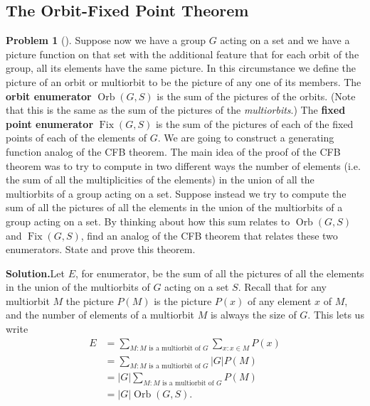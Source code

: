 \documentclass[10pt,]{book}
\newcommand{\terminology}[1]{\textbf{#1}}
\theoremstyle{plain}
\theoremstyle{definition}
\newtheorem{activity}[project]{Problem}
\theoremstyle{definition}
\numberwithin{equation}{chapter}
\DeclareMathOperator{\Fix}{Fix}
\DeclareMathOperator{\Orb}{Orb}
\begin{document}
\subsection[{The Orbit-Fixed Point Theorem}]{The Orbit-Fixed Point Theorem}\label{subsection-60}
\begin{activity}[]\label{orbit-fixed-point-thm}
Suppose now we have a group \(G\) acting on a set and we have a picture function on that set with the additional feature that for each orbit of the group, all its elements have the same picture. In this circumstance we define the picture of an orbit or multiorbit to be the picture of any one of its members. The \terminology{orbit enumerator} \(\Orb(G,S)\) is the sum of the pictures of the orbits. (Note that this is the same as the sum of the pictures of the \emph{multiorbits}.) The \terminology{fixed point enumerator} \(\Fix(G, S)\) is the sum of the pictures of each of the fixed points of each of the elements of \(G\). We are going to construct a generating function analog of the CFB theorem. The main idea of the proof of the CFB theorem was to try to compute in two different ways the number of elements (i.e. the sum of all the multiplicities of the elements) in the union of all the multiorbits of a group acting on a set. Suppose instead we try to compute the sum of all the pictures of all the elements in the union of the multiorbits of a group acting on a set. By thinking about how this sum relates to \(\Orb(G,S)\) and \(\Fix(G,S)\), find an analog of the CFB theorem that relates these two enumerators. State and prove this theorem. %
\par\medskip\noindent%
\textbf{Solution.}\quad Let \(E\), for enumerator, be the sum of all the pictures of all the elements in the union of the multiorbits of \(G\) acting on a set \(S\). Recall that for any multiorbit \(M\) the picture \(P(M)\) is the picture \(P(x)\) of any element \(x\) of \(M\), and the number of elements of a multiorbit \(M\) is always the size of \(G\). This lets us write%
\begin{align*}
E &= \sum_{M\colon M\text{ is a multiorbit of }G}\sum_{x\colon x\in M} P(x)\\
&= \sum_{M\colon M\text{ is a multiorbit of }G}|G|P(M)\\
&= |G|\sum_{M\colon M\text{ is a multiorbit of }G}P(M)\\
&= |G|\Orb(G,S)\text{.}
\end{align*}

\end{activity}
\end{document}
